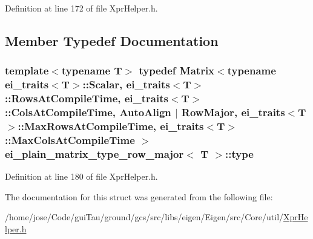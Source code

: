 Definition at line 172 of file Xpr\-Helper.\-h.



\subsection{Member Typedef Documentation}
\hypertarget{structei__plain__matrix__type__row__major_a0c895ed93a7f6fa5cbd3c308d539b9ce}{
\subsubsection[{type}]{\setlength{\rightskip}{0pt plus 5cm}template$<$typename T$>$ typedef {\bf Matrix}$<$typename {\bf ei\-\_\-traits}$<$T$>$\-::Scalar, {\bf ei\-\_\-traits}$<$T$>$\-::Rows\-At\-Compile\-Time, {\bf ei\-\_\-traits}$<$T$>$\-::Cols\-At\-Compile\-Time, {\bf Auto\-Align} $|$ {\bf Row\-Major}, {\bf ei\-\_\-traits}$<$T$>$\-::Max\-Rows\-At\-Compile\-Time, {\bf ei\-\_\-traits}$<$T$>$\-::Max\-Cols\-At\-Compile\-Time $>$ {\bf ei\-\_\-plain\-\_\-matrix\-\_\-type\-\_\-row\-\_\-major}$<$ T $>$\-::{\bf type}}}\label{structei__plain__matrix__type__row__major_a0c895ed93a7f6fa5cbd3c308d539b9ce}


Definition at line 180 of file Xpr\-Helper.\-h.



The documentation for this struct was generated from the following file\-:\begin{DoxyCompactItemize}
\item 
/home/jose/\-Code/gui\-Tau/ground/gcs/src/libs/eigen/\-Eigen/src/\-Core/util/\hyperlink{_xpr_helper_8h}{Xpr\-Helper.\-h}\end{DoxyCompactItemize}
